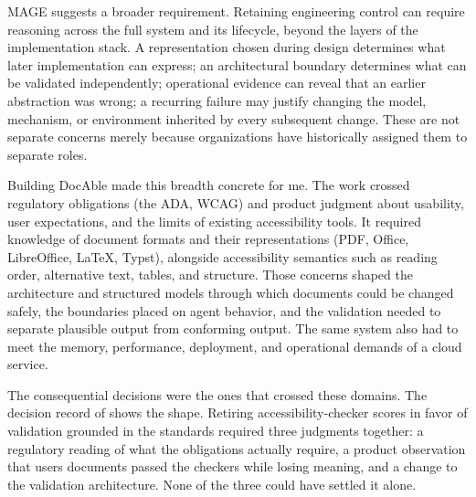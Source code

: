 
MAGE suggests a broader requirement. Retaining engineering control can require reasoning across the full system and its lifecycle, beyond the layers of the implementation stack. A representation chosen during design determines what later implementation can express; an architectural boundary determines what can be validated independently; operational evidence can reveal that an earlier abstraction was wrong; a recurring failure may justify changing the model, mechanism, or environment inherited by every subsequent change. These are not separate concerns merely because organizations have historically assigned them to separate roles.


Building DocAble made this breadth concrete for me. The work crossed regulatory obligations (the ADA, WCAG) and product judgment about usability, user expectations, and the limits of existing accessibility tools. It required knowledge of document formats and their representations (PDF, Office, LibreOffice, LaTeX, Typst), alongside accessibility semantics such as reading order, alternative text, tables, and structure. Those concerns shaped the architecture and structured models through which documents could be changed safely, the boundaries placed on agent behavior, and the validation needed to separate plausible output from conforming output. The same system also had to meet the memory, performance, deployment, and operational demands of a cloud service.

The consequential decisions were the ones that crossed these domains. The decision record of  shows the shape. Retiring accessibility-checker scores in favor of validation grounded in the standards required three judgments together: a regulatory reading of what the obligations actually require, a product observation that users\textquotesingle{} documents passed the checkers while losing meaning, and a change to the validation architecture. None of the three could have settled it alone.

